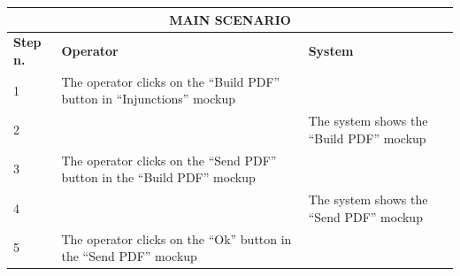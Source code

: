 {{{\begin{center}
			\begin{tabular}{|p{2cm}|p{6cm}|p{6cm}|}
			\hline
				\multicolumn{3}{|c|}{MAIN SCENARIO}\\
			\hline
				\centering \vspace{1mm} \bfseries{Step n.} \vspace{1mm} & \vspace{1mm} \bfseries{Operator} \vspace{1mm} & \vspace{1mm} \bfseries{System} \vspace{1mm}\\
			\hline
				\vspace{1mm} 1\vspace{1mm} &
				\vspace{1mm} The operator clicks on the “Build PDF” button in “Injunctions” mockup \vspace{1mm} & 
				\vspace{1mm} \vspace{1mm} \\
			\hline
				\vspace{1mm} 2\vspace{1mm} &
				\vspace{1mm} \vspace{1mm} & 
				\vspace{1mm} The system shows the “Build PDF” mockup\vspace{1mm} \\
			\hline
				\vspace{1mm} 3\vspace{1mm} &
				\vspace{1mm} The operator clicks on the “Send PDF” button in the “Build PDF” mockup \vspace{1mm} & 
				\vspace{1mm} \vspace{1mm} \\
			\hline
				\vspace{1mm} 4\vspace{1mm} &
				\vspace{1mm} \vspace{1mm} & 
				\vspace{1mm} The system shows the “Send PDF” mockup \vspace{1mm} \\
			\hline
				\vspace{1mm} 5\vspace{1mm} &
				\vspace{1mm} The operator clicks on the “Ok” button in the “Send PDF” mockup \vspace{1mm} & 

\end{tabular}
\end{center}}}}
